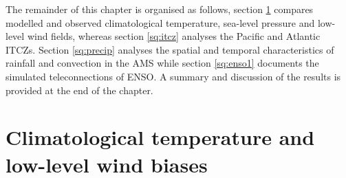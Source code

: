 The remainder of this chapter is organised as follows, section  \ref{sq:clim} compares modelled and observed climatological temperature, sea-level pressure and low-level wind fields,  whereas section \ref{sq:itcz} analyses the Pacific and Atlantic ITCZs. Section \ref{sq:precip} analyses the spatial and temporal characteristics of rainfall and convection in the AMS while section \ref{sq:enso1} documents the simulated teleconnections of ENSO. A summary and discussion of the results is provided at the end of the chapter.



 

%


\section{Climatological temperature and low-level wind biases} \label{sq:clim}

